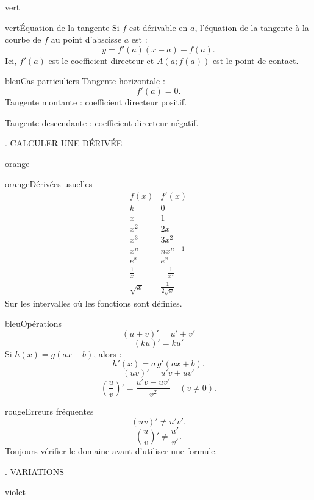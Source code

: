 \documentclass[11pt,a4paper]{article}
\newcommand{\tagcol}[2]{\begin{tcolorbox}[enhanced,colback=#1!11,colframe=#1!45!black,boxrule=0.42pt,arc=2mm,left=1mm,right=1mm,top=0.45mm,bottom=0.45mm,before skip=0mm,after skip=0.85mm,fontupper=\bfseries\scriptsize,colupper=#1!55!black]\centering #2\end{tcolorbox}}
\begin{document}
\begin{landscape}
\begin{minipage}[t]{0.242\linewidth}
\begin{panel}{vert}
\begin{fichebox}{vert}{Équation de la tangente}
Si $f$ est dérivable en $a$, l'équation de la tangente à la courbe de $f$ au point d'abscisse $a$ est :
\[
 y=f'(a)(x-a)+f(a).
\]
Ici, $f'(a)$ est le coefficient directeur et $A(a;f(a))$ est le point de contact.
\end{fichebox}

\begin{fichebox}{bleu}{Cas particuliers}
Tangente horizontale :
\[
 f'(a)=0.
\]
Tangente montante : coefficient directeur positif.

Tangente descendante : coefficient directeur négatif.
\end{fichebox}

\end{panel}
\end{minipage}\hfill
\begin{minipage}[t]{0.242\linewidth}
\tagcol{orange}{3. CALCULER UNE DÉRIVÉE}
\begin{panel}{orange}

\begin{fichebox}{orange}{Dérivées usuelles}
\[
\begin{array}{c|c}
f(x)&f'(x)\\ \hline
k&0\\
x&1\\
x^2&2x\\
x^3&3x^2\\
x^n&nx^{n-1}\\
e^x&e^x\\
\frac1x&-\frac1{x^2}\\
\sqrt{x}&\frac1{2\sqrt{x}}
\end{array}
\]
Sur les intervalles où les fonctions sont définies.
\end{fichebox}

\begin{fichebox}{bleu}{Opérations}
\[
(u+v)'=u'+v'
\]
\[
(ku)'=ku'
\]
Si $h(x)=g(ax+b)$, alors :
\[
h'(x)=a\,g'(ax+b).
\]
\[
(uv)'=u'v+uv'
\]
\[
\left(\frac{u}{v}\right)'=\frac{u'v-uv'}{v^2}
\quad (v\neq0).
\]
\end{fichebox}

\begin{fichebox}{rouge}{Erreurs fréquentes}
\[
(uv)'\neq u'v'.
\]
\[
\left(\frac{u}{v}\right)'\neq\frac{u'}{v'}.
\]
Toujours vérifier le domaine avant d'utiliser une formule.
\end{fichebox}

\end{panel}
\end{minipage}\hfill
\begin{minipage}[t]{0.242\linewidth}
\tagcol{violet}{4. VARIATIONS}
\begin{panel}{violet}


\end{panel}
\end{minipage}
\end{landscape}
\end{document}
